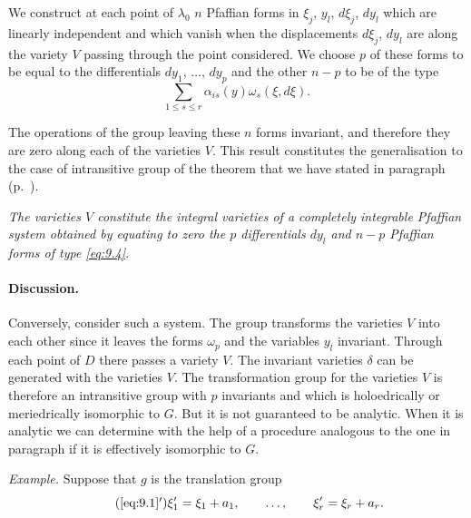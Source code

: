 \somespace

We construct at each point of $\lambda_{0}$ $n$ Pfaffian forms in $\xi_{j}$, $y_{l}$, $d\xi_{j}$, $dy_{l}$ which are linearly independent and which vanish when the displacements $d\xi_{j}$, $dy_{l}$ are along the variety $V$ passing through the point considered. We choose $p$ of these forms to be equal to the differentials $dy_{1}$, $\dots$, $dy_{p}$ and the other $n-p$ to be of the type
\begin{equation}
  \label{eq:9.4}
  \sum_{1\le s\le r}\alpha_{is}(y)\omega_{s}(\xi,d\xi).
\end{equation}

The operations of the group leaving these $n$ forms invariant, and therefore they are zero along each of the varieties $V$. This result constitutes the generalisation to the case of intransitive group of the theorem that we have stated in paragraph  (p.~\pageref{sec:116}).

\somespace

\emph{The varieties $V$ constitute the integral varieties of a completely integrable Pfaffian system obtained by equating to zero the $p$ differentials $dy_{l}$ and $n-p$ Pfaffian forms of type \eqref{eq:9.4}.}




\paragraph{Discussion.}
\label{sec:120}
Conversely, consider such a system. The group transforms the varieties $V$ into each other since it leaves the forms $\omega_{p}$ and the variables $y_{l}$ invariant. Through each point of $D$ there passes a variety $V$. The invariant varieties $\delta$ can be generated with the varieties $V$. The transformation group for the varieties $V$ is therefore an intransitive group with $p$ invariants and which is holoedrically or meriedrically isomorphic to $G$. But it is not guaranteed to be analytic. When it is analytic we can determine with the help of a procedure analogous to the one in paragraph  if it is effectively isomorphic to $G$.

\somespace

\emph{Example.} Suppose that $g$ is the translation group
\begin{equation}
  \label{eq:9.1'}\tag{\ref{eq:9.1}$'$}
  \xi'_{1}=\xi_{1}+a_{1},\qquad\dots,\qquad\xi'_{r}=\xi_{r}+a_{r}.
\end{equation}

